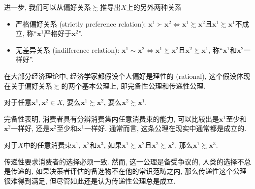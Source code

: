 \documentclass[cn, 12pt, math=mtpro2, bibstyle=apa, blue]{elegantbook}
\newcommand{\x}{\mathbf{x}}
\begin{document}
进一步, 我们可以从偏好关系$\succsim$推导出$X$上的另外两种关系
\begin{itemize}
  \item 严格偏好关系 (strictly preference relation): $\x^1\succ \x^2 \Leftrightarrow \x^1\succsim \x^2$且$ \x^1\succsim \x^1$不成立, 称“$\x^1$严格好于$\x^2$”.
  \item 无差异关系 (indifference relation): $\x^1\sim \x^2 \Leftrightarrow \x^1\succsim \x^2$且$\x^2\succsim \x^1$, 称“$\x^1$和$\x^2$一样好”.
\end{itemize}
在大部分经济理论中, 经济学家都假设个人偏好是理性的 (rational), 这个假设体现在关于偏好关系$\succsim$的两个基本公理上, 即完备性公理和传递性公理.

\begin{axiom}[完备性]\label{axi:axi1.1}
对于任意$\x^1, \x^2\in X$, 要么$\x^1\succsim \x^2$, 要么$\x^2\succsim \x^1$.
\end{axiom}
完备性表明, 消费者具有分辨消费集内任意消费束的能力, 可以比较出是$\x^1$至少和$\x^2$一样好, 还是$\x^2$至少和$\x^1$一样好. 通常而言, 这条公理在现实中通常都是成立的.

\begin{axiom}[传递性]\label{axi:axi1.2}
对于$X$中的任意消费束$\x^1$, $\x^2$和$\x^3$, 如果$\x^1\succsim \x^2$且$\x^2\succsim\x^3$, 那么$\x^1\succsim\x^3$.
\end{axiom}
传递性要求消费者的选择必须一致. 然而, 这一公理是备受争议的, 人类的选择不总是传递的, 如果决策者评估的备选物不在他的常识范畴之内, 那么传递性这个公理很难得到满足, 但尽管如此还是认为传递性公理总是成立.
\end{document}
